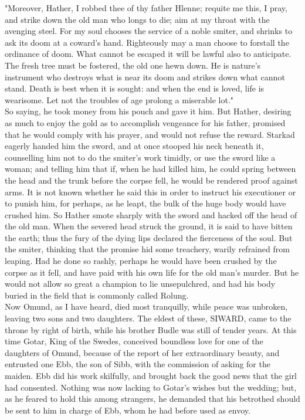 \documentclass[10pt,a4paper]{report}
\begin{document}
"Moreover, Hather, I robbed thee of thy father Hlenne; requite me this, I pray, and strike down the old man who longs to die; aim at my throat with the avenging steel. For my soul chooses the service of a noble smiter, and shrinks to ask its doom at a coward's hand. Righteously may a man choose to forstall the ordinance of doom. What cannot be escaped it will be lawful also to anticipate. The fresh tree must be fostered, the old one hewn down. He is nature's instrument who destroys what is near its doom and strikes down what cannot stand. Death is best when it is sought: and when the end is loved, life is wearisome. Let not the troubles of age prolong a miserable lot."\\

So saying, he took money from his pouch and gave it him. But Hather, desiring as much to enjoy the gold as to accomplish vengeance for his father, promised that he would comply with his prayer, and would not refuse the reward. Starkad eagerly handed him the sword, and at once stooped his neck beneath it, counselling him not to do the smiter's work timidly, or use the sword like a woman; and telling him that if, when he had killed him, he could spring between the head and the trunk before the corpse fell, he would be rendered proof against arms. It is not known whether he said this in order to instruct his executioner or to punish him, for perhaps, as he leapt, the bulk of the huge body would have crushed him. So Hather smote sharply with the sword and hacked off the head of the old man. When the severed head struck the ground, it is said to have bitten the earth; thus the fury of the dying lips declared the fierceness of the soul. But the smiter, thinking that the promise hid some treachery, warily refrained from leaping. Had he done so rashly, perhaps he would have been crushed by the corpse as it fell, and have paid with his own life for the old man's murder. But he would not allow so great a champion to lie unsepulchred, and had his body buried in the field that is commonly called Rolung.\\

Now Omund, as I have heard, died most tranquilly, while peace was unbroken, leaving two sons and two daughters. The eldest of these, SIWARD, came to the throne by right of birth, while his brother Budle was still of tender years. At this time Gotar, King of the Swedes, conceived boundless love for one of the daughters of Omund, because of the report of her extraordinary beauty, and entrusted one Ebb, the son of Sibb, with the commission of asking for the maiden. Ebb did his work skilfully, and brought back the good news that the girl had consented. Nothing was now lacking to Gotar's wishes but the wedding; but, as he feared to hold this among strangers, he demanded that his betrothed should be sent to him in charge of Ebb, whom he had before used as envoy.\\
\end{document}

